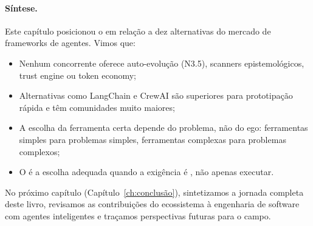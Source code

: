 \paragraph{Síntese.} Este capítulo posicionou o \opencodeeco{} em relação a
dez alternativas do mercado de frameworks de agentes. Vimos que:
\begin{itemize}
\item Nenhum concorrente oferece auto-evolução (N3.5), scanners
epistemológicos, trust engine ou token economy;
\item Alternativas como LangChain e CrewAI são superiores para
prototipação rápida e têm comunidades muito maiores;
\item A escolha da ferramenta certa depende do problema, não do
ego: ferramentas simples para problemas simples, ferramentas
complexas para problemas complexos;
\item O \opencodeeco{} é a escolha adequada quando a exigência é
, não apenas executar.
\end{itemize}
No próximo capítulo (Capítulo~\ref{ch:conclusão}), sintetizamos a jornada
completa deste livro, revisamos as contribuições do ecossistema à
engenharia de software com agentes inteligentes e traçamos perspectivas
futuras para o campo.
